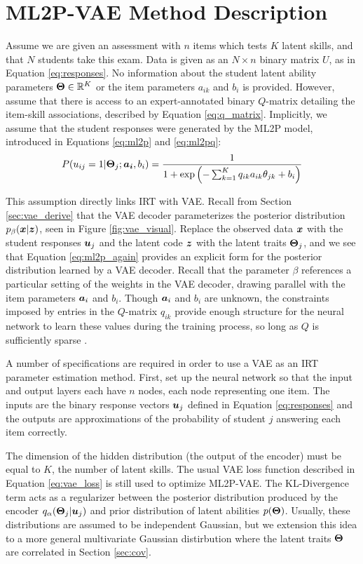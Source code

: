 \section{ML2P-VAE Method Description}\label{sec:ml2p_vae}
Assume we are given an assessment with $n$ items which tests $K$ latent skills, and that $N$ students take this exam. Data is given as an $N \times n$ binary matrix $U$, as in Equation \ref{eq:responses}. No information about the student latent ability parameters $\boldsymbol{\Theta} \in \mathbb{R}^K$ or the item parameters $a_{ik}$ and $b_i$ is provided. However, assume that there is access to an expert-annotated binary $Q$-matrix detailing the item-skill associations, described by Equation \ref{eq:q_matrix}. Implicitly, we assume that the student responses were generated by the ML2P model, introduced in Equations \ref{eq:ml2p} and \ref{eq:ml2pq}:
\begin{equation}
  P(u_{ij} = 1 | \boldsymbol{\Theta}_j; \boldsymbol{a_i}, b_i) = \frac{1}{1 + \exp\left(-\sum_{k=1}^K q_{ik} a_{ik} \theta_{jk} + b_i \right)}
  \label{eq:ml2p_again}
\end{equation}

This assumption directly links IRT with VAE. Recall from Section \ref{sec:vae_derive} that the VAE decoder parameterizes the posterior distribution $p_\beta(\boldsymbol{x} | \boldsymbol{z})$, seen in Figure \ref{fig:vae_visual}. Replace the observed data $\boldsymbol{x}$ with the student responses $\boldsymbol{u}_j$ and the latent code $\boldsymbol{z}$ with the latent traits $\boldsymbol{\Theta}_j$, and we see that Equation \ref{eq:ml2p_again} provides an explicit form for the posterior distribution learned by a VAE decoder. Recall that the parameter $\beta$ references a particular setting of the weights in the VAE decoder, drawing parallel with the item parameters $\boldsymbol{a}_i$ and $b_i$. Though $\boldsymbol{a}_i$ and $b_i$ are unknown, the constraints imposed by entries in the $Q$-matrix $q_{ik}$ provide enough structure for the neural network to learn these values during the training process, so long as $Q$ is sufficiently sparse \cite{jiang2018}.

A number of specifications are required in order to use a VAE as an IRT parameter estimation method. First, set up the neural network so that the input and output layers each have $n$ nodes, each node representing one item. The inputs are the binary response vectors $\boldsymbol{u}_j$ defined in Equation \ref{eq:responses} and the outputs are approximations of the probability of student $j$ answering each item correctly. 

The dimension of the hidden distribution (the output of the encoder) must be equal to $K$, the number of latent skills. The usual VAE loss function described in Equation \ref{eq:vae_loss} is still used to optimize ML2P-VAE. The KL-Divergence term acts as a regularizer between the posterior distribution produced by the encoder $q_\alpha(\boldsymbol{\Theta}_j | \boldsymbol{u}_j)$ and prior distribution of latent abilities $p(\boldsymbol{\Theta})$. Usually, these distributions are assumed to be independent Gaussian, but we extension this idea to a more general multivariate Gaussian distirbution where the latent traits $\boldsymbol{\Theta}$ are correlated in Section \ref{sec:cov}.

